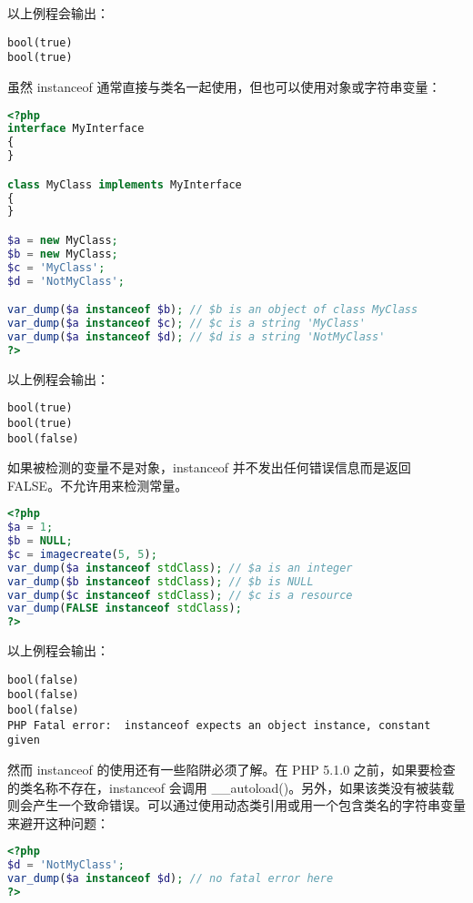 以上例程会输出：

\begin{verbatim}
bool(true)
bool(true)
\end{verbatim}

虽然 instanceof 通常直接与类名一起使用，但也可以使用对象或字符串变量：

\begin{lstlisting}[language=PHP]
<?php
interface MyInterface
{
}

class MyClass implements MyInterface
{
}

$a = new MyClass;
$b = new MyClass;
$c = 'MyClass';
$d = 'NotMyClass';

var_dump($a instanceof $b); // $b is an object of class MyClass
var_dump($a instanceof $c); // $c is a string 'MyClass'
var_dump($a instanceof $d); // $d is a string 'NotMyClass'
?>
\end{lstlisting}

以上例程会输出：

\begin{verbatim}
bool(true)
bool(true)
bool(false)
\end{verbatim}


如果被检测的变量不是对象，instanceof 并不发出任何错误信息而是返回 FALSE。不允许用来检测常量。

\begin{lstlisting}[language=PHP]
<?php
$a = 1;
$b = NULL;
$c = imagecreate(5, 5);
var_dump($a instanceof stdClass); // $a is an integer
var_dump($b instanceof stdClass); // $b is NULL
var_dump($c instanceof stdClass); // $c is a resource
var_dump(FALSE instanceof stdClass);
?>
\end{lstlisting}

以上例程会输出：

\begin{verbatim}
bool(false)
bool(false)
bool(false)
PHP Fatal error:  instanceof expects an object instance, constant given
\end{verbatim}


然而 instanceof 的使用还有一些陷阱必须了解。在 PHP 5.1.0 之前，如果要检查的类名称不存在，instanceof 会调用 \_\_autoload()。另外，如果该类没有被装载则会产生一个致命错误。可以通过使用动态类引用或用一个包含类名的字符串变量来避开这种问题：

\begin{lstlisting}[language=PHP]
<?php
$d = 'NotMyClass';
var_dump($a instanceof $d); // no fatal error here
?>
\end{lstlisting}

